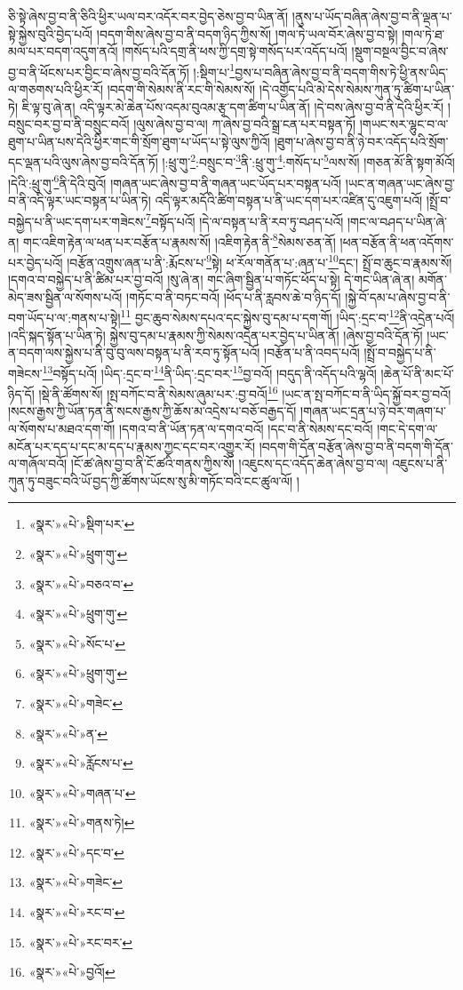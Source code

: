 ཅི་སྟེ་ཞེས་བྱ་བ་ནི་ཅིའི་ཕྱིར་ཡལ་བར་འདོར་བར་བྱེད་ཅེས་བྱ་བ་ཡིན་ནོ། །ནུས་པ་ཡོད་བཞིན་ཞེས་བྱ་བ་ནི་ལྡན་པ་སྟེ་སྐྱེས་བུའི་བྱེད་པའོ། །བདག་གིས་ཞེས་བྱ་བ་ནི་བདག་ཉིད་ཀྱིས་སོ། །གལ་ཏེ་ཡལ་བོར་ཞེས་བྱ་བ་སྟེ། །གལ་ཏེ་ཐ་མལ་པར་བདག་འདུག་ནའོ། །གསོད་པའི་དགྲ་ནི་ཕས་ཀྱི་དགྲ་སྟེ་གསོད་པར་འདོད་པའོ། །སྡུག་བསྔལ་བྱིང་བ་ཞེས་བྱ་བ་ནི་ཕོངས་པར་བྱིང་བ་ཞེས་བྱ་བའི་དོན་ཏོ། །:སྡིག་པ་\footnote{«སྣར་»«པེ་»སྡིག་པར་}བྱས་པ་བཞིན་ཞེས་བྱ་བ་ནི་བདག་གིས་ཏེ་ཕྱི་ནས་ཡིད་ལ་གཅགས་པའི་ཕྱིར་རོ། །བདག་གི་སེམས་ནི་རང་གི་སེམས་སོ། །དེ་འགྱོད་པའི་མེ་དེས་སེམས་ཀུན་ཏུ་ཚིག་པ་ཡིན་ཏེ། ཇི་ལྟ་བུ་ཞེ་ན། འདི་ལྟར་མེ་ཆེན་པོས་འདམ་བུའམ་རྩྭ་དག་ཚིག་པ་ཡིན་ནོ། །དེ་བས་ཞེས་བྱ་བ་ནི་དེའི་ཕྱིར་རོ། །བསྲུང་བར་བྱ་བ་ནི་བསྲུང་བའོ། །ལུས་ཞེས་བྱ་བ་ལ། ཀ་ཞེས་བྱ་བའི་སྒྲ་ངན་པར་བསྟན་ཏོ། །གཡང་སར་ལྷུང་བ་ལ་ཐུག་པ་ཡིན་པས་དེའི་ཕྱིར་གང་གི་སྲོག་ཐུག་པ་ཡོད་པ་སྟེ་ལུས་ཀྱིའོ། །ཐུག་པ་ཞེས་བྱ་བ་ནི་ཉེ་བར་འདོད་པའི་སྲོག་དང་ལྡན་པའི་ལུས་ཞེས་བྱ་བའི་དོན་ཏོ། །:ཕྲུ་གུ་\footnote{«སྣར་»«པེ་»ཕྲུག་གུ་}:བསྲུང་བ་\footnote{«སྣར་»«པེ་»བཅའ་བ་}ནི་:ཕྲུ་གུ་\footnote{«སྣར་»«པེ་»ཕྲུག་གུ་}:གསོད་པ་\footnote{«སྣར་»«པེ་»སོང་པ་}ལས་སོ། །གཅན་མོ་ནི་སྟག་མོའོ། །དེའི་:ཕྲུ་གུ་\footnote{«སྣར་»«པེ་»ཕྲུག་གུ་}ནི་དེའི་བུའོ། །གཞན་ཡང་ཞེས་བྱ་བ་ནི་གཞན་ཡང་ཡོད་པར་བསྟན་པའོ། །ཡང་ན་གཞན་ཡང་ཞེས་བྱ་བ་ནི་འདི་ལྟར་ཡང་བསྟན་པ་ཡིན་ཏེ། འདི་ལྟར་མདོའི་ཚིག་བསྟན་པ་ནི་ཡང་དག་པར་འཛིན་དུ་འཇུག་པའོ། །སྤྲོ་བ་བསྐྱེད་པ་ནི་ཡང་དག་པར་གཟེངས་\footnote{«སྣར་»«པེ་»གཟེང་}བསྟོད་པའོ། །དེ་ལ་བསྟན་པ་ནི་རབ་ཏུ་བཤད་པའོ། །གང་ལ་བཤད་པ་ཡིན་ཞེ་ན། གང་འཇིག་རྟེན་ལ་ཕན་པར་བརྩོན་པ་རྣམས་སོ། །འཇིག་རྟེན་ནི་\footnote{«སྣར་»«པེ་»ན་}སེམས་ཅན་ནོ། །ཕན་བརྩོན་ནི་ཕན་འདོགས་པར་བྱེད་པའོ། །བརྩོན་འགྲུས་ཞན་པ་ནི་:རྨོངས་པ་\footnote{«སྣར་»«པེ་»རློངས་པ་}སྟེ། ཕ་རོལ་གནོན་པ་:ཞན་པ་\footnote{«སྣར་»«པེ་»གཞན་པ་}དང་། སྤྲོ་བ་ཆུང་བ་རྣམས་སོ། །དགའ་བ་བསྐྱེད་པ་ནི་ཚིམ་པར་བྱ་བའོ། །སུ་ཞེ་ན། གང་ཞིག་སྦྱིན་པ་གཏོང་ཕོད་པ་སྟེ། དེ་གང་ཡིན་ཞེ་ན། མགོན་མེད་ཟས་སྦྱིན་ལ་སོགས་པའོ། །གཏོང་བ་ནི་བཏང་བའོ། །ཕོད་པ་ནི་རླབས་ཆེ་བ་ཉིད་དོ། །སྐྱེ་བོ་དམ་པ་ཞེས་བྱ་བ་ནི་བག་ཡོད་པ་ལ་:གནས་པ་སྟེ།\footnote{«སྣར་»«པེ་»གནས་ཏེ།} བྱང་ཆུབ་སེམས་དཔའ་དང་སྐྱེས་བུ་དམ་པ་དག་གོ། །ཡིད་:དྲང་བ་\footnote{«སྣར་»«པེ་»དང་བ་}ནི་འདྲེན་པའོ། །འདི་སྐད་སྟོན་པ་ཡིན་ཏེ། སྐྱེས་བུ་དམ་པ་རྣམས་ཀྱི་སེམས་འདྲེན་པར་བྱེད་པ་ཡིན་ནོ། །ཞེས་བྱ་བའི་དོན་ཏོ། །ཡང་ན་བདག་ལས་སྐྱེས་པ་ནི་བུ་བུ་ལས་བསྟན་པ་ནི་རབ་ཏུ་སྟོན་པའོ། །བརྩོན་པ་ནི་འབད་པའོ། །སྤྲོ་བ་བསྐྱེད་པ་ནི་གཟེངས་\footnote{«སྣར་»«པེ་»གཟེང་}བསྟོད་པའོ། །ཡིད་:དྲང་བ་\footnote{«སྣར་»«པེ་»རང་བ་}ནི་ཡིད་:དྲང་བར་\footnote{«སྣར་»«པེ་»རང་བར་}བྱ་བའོ། །བདུད་ནི་འདོད་པའི་ལྷའོ། །ཆེན་པོ་ནི་མང་པོ་ཉིད་དོ། །སྡེ་ནི་ཚོགས་སོ། །སྤ་བཀོང་བ་ནི་སེམས་ཞུམ་པར་:བྱ་བའོ།\footnote{«སྣར་»«པེ་»བྱའོ།} །ཡང་ན་སྤ་བཀོང་བ་ནི་ཡིད་སྐྱོ་བར་བྱ་བའོ། །སངས་རྒྱས་ཀྱི་ཡོན་ཏན་ནི་སངས་རྒྱས་ཀྱི་ཆོས་མ་འདྲེས་པ་བཅོ་བརྒྱད་དོ། །གཞན་ཡང་དྲན་པ་ཉེ་བར་གཞག་པ་ལ་སོགས་པ་མཐའ་དག་གོ། །དགའ་བ་ནི་ཡོན་ཏན་ལ་དགའ་བའོ། །དང་བ་ནི་སེམས་དང་བའོ། །གང་དེ་དག་ལ་མངོན་པར་དད་པ་དང་མ་དད་པ་རྣམས་ཀྱང་དང་བར་འགྱུར་རོ། །བདག་གི་དོན་བརྩོན་ཞེས་བྱ་བ་ནི་བདག་གི་དོན་ལ་གཞོལ་བའོ། །ངོ་ཚ་ཞེས་བྱ་བ་ནི་ངོ་ཚའི་གནས་ཀྱིས་སོ། །འཇུངས་དང་འདོད་ཆེན་ཞེས་བྱ་བ་ལ། འཇུངས་པ་ནི་ཀུན་ཏུ་བཟུང་བའི་ཡོ་བྱད་ཀྱི་ཚོགས་ཡོངས་སུ་མི་གཏོང་བའི་ངང་ཚུལ་ལོ། །
